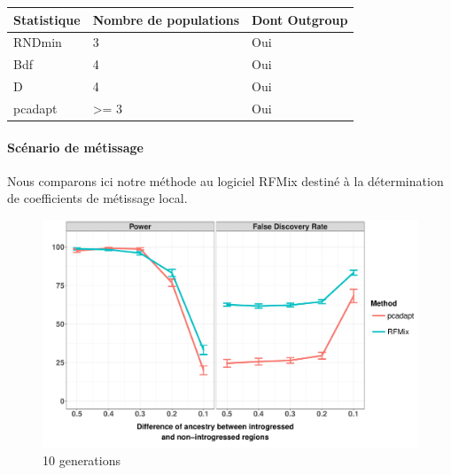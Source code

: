 \documentclass[12pt,twoside]{reedthesis}
\begin{document}
  \begin{Shaded}
  \begin{Highlighting}[]
  \StringTok{ }\NormalTok{(} \NormalTok{(}\NormalTok{, }\NormalTok{, }\NormalTok{, }\NormalTok{),}
                       \NormalTok{(}\NormalTok{, }\NormalTok{, }\NormalTok{, }\NormalTok{),}
                       \NormalTok{(}\NormalTok{, }\NormalTok{, }\NormalTok{, }\NormalTok{))}
  
                \NormalTok{(}\NormalTok{, }
                             \NormalTok{, }
                             \NormalTok{))}
  \end{Highlighting}
  \end{Shaded}
  
  \begin{tabular}{l|l|l}
  \hline
  Statistique & Nombre de populations & Dont Outgroup\\
  \hline
  RNDmin & 3 & Oui\\
  \hline
  Bdf & 4 & Oui\\
  \hline
  D & 4 & Oui\\
  \hline
  pcadapt & >= 3 & Oui\\
  \hline
  \end{tabular}
  
  \paragraph{Scénario de métissage}\label{scenario-de-metissage}
  
  Nous comparons ici notre méthode au logiciel RFMix destiné à la
  détermination de coefficients de métissage local.
  
  \begin{figure}
  \includegraphics[width=500px]{figure/facet_admixture_setting_10_gen} \caption{10 generations}\label{fig:ras10g}
  \end{figure}
  
\end{document}
